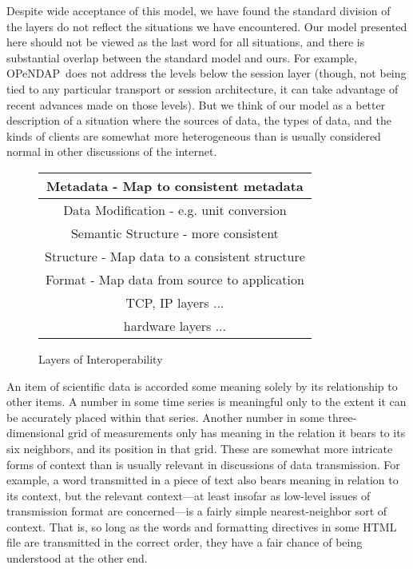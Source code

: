 \documentclass{codata}
\newcommand{\opendap}{\ac{OPeNDAP}}
\begin{document}
Despite wide acceptance of this model, we have found the standard
division of the layers do not reflect the situations we have
encountered.  Our model presented here should not be viewed as the
last word for all situations, and there is substantial overlap between
the standard model and ours.  For example, \opendap\ does not address
the levels below the session layer (though, not being tied to any
particular transport or session architecture, it can take advantage of
recent advances made on those levels).  But we think of our model as a
better description of a situation where the sources of data, the types
of data, and the kinds of clients are somewhat more heterogeneous than
is usually considered normal in other discussions of the internet.

\begin{figure}[htbp]
  \begin{center}
{\bfseries\sffamily \begin{tabular}{|c|} \hline
{\Huge\strut} Metadata - Map to consistent metadata\\ \hline
{\Huge\strut} Data Modification - e.g. unit conversion\\ \hline
{\Huge\strut} Semantic Structure - more consistent \\ \hline
{\Huge\strut} Structure - Map data to a consistent structure \\ \hline
{\Huge\strut} Format - Map data from source to application\\ \hline
{\Huge\strut} TCP, IP layers ... \\ \hline 
{\Huge\strut} hardware layers ... \\ \hline
\end{tabular}}
    \caption{Layers of Interoperability}
    \label{fig:layers}
  \end{center}
\end{figure}

An item of scientific data is accorded some meaning solely by its
relationship to other items.  A number in some time series is
meaningful only to the extent it can be accurately placed within that
series.  Another number in some three-dimensional grid of measurements
only has meaning in the relation it bears to its six neighbors, and
its position in that grid.  These are somewhat more intricate forms of
context than is usually relevant in discussions of data transmission.
For example, a word transmitted in a piece of text also bears meaning
in relation to its context, but the relevant context---at least
insofar as low-level issues of transmission format are concerned---is
a fairly simple nearest-neighbor sort of context.  That is, so long as
the words and formatting directives in some HTML file are transmitted
in the correct order, they have a fair chance of being understood at
the other end.
\end{document}
